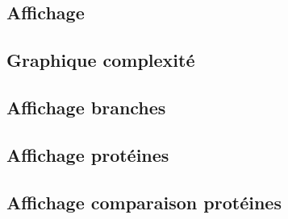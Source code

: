 \begin{frame}
    \section{Affichage}
    \subsection{Graphique complexité}
    
    \subsection{Affichage branches}
    
    \subsection{Affichage protéines}
    
    \subsection{Affichage comparaison protéines}
    
\end{frame}
